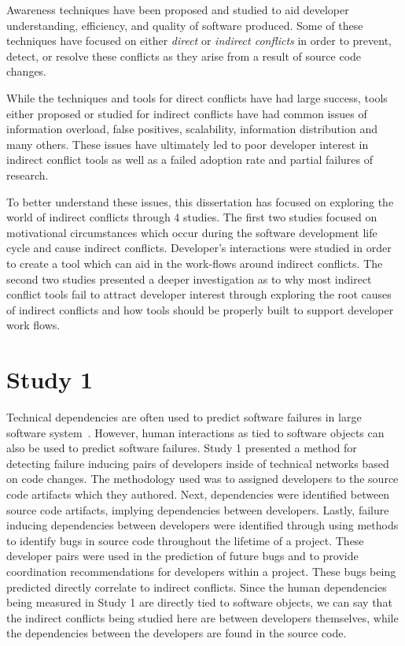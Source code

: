 \label{concl}

Awareness techniques have been proposed and studied to aid developer
understanding, efficiency, and quality of software produced. Some of these techniques have focused 
on either \textit{direct} or \textit{indirect conflicts} in order to prevent, detect, or resolve these conflicts as 
they arise from a result of source code changes. 

While the techniques and tools for direct conflicts have had large success, tools either proposed or studied for 
indirect conflicts have had common issues of information overload, false positives, scalability, information distribution 
and many others. These issues have ultimately led to poor developer interest in indirect conflict tools as well
as a failed adoption rate and partial failures of research.

To better understand these issues, this dissertation has focused on exploring the world of indirect 
conflicts through 4 studies. The first two studies focused on motivational circumstances which occur during 
the software development life cycle and cause indirect conflicts. Developer's interactions were studied in order to create 
a tool which can aid in the work-flows around indirect conflicts. The second two studies presented a deeper investigation 
as to why most indirect conflict tools fail to attract developer interest through exploring the root causes of indirect conflicts 
and how tools should be properly built to support developer work flows.

\section{Study 1}

Technical dependencies are often used to predict software failures
in large software system~\cite{Pinzger:2008:DNP, Zimmermann:2008:PDU, Kim:2006:AIB}. However, human interactions as tied
to software objects can also be used to predict software failures.
Study 1 presented a method for detecting failure inducing pairs of developers inside
of technical networks based on code changes. The methodology used was to assigned developers to the source code artifacts
which they authored. Next, dependencies were identified between source code artifacts, implying dependencies between
developers. Lastly, failure inducing dependencies between developers were identified through using methods to identify
bugs in source code throughout the lifetime of a project. These developer pairs were used in the prediction
of future bugs and to provide coordination recommendations for developers within a project. These bugs being predicted
directly correlate to indirect conflicts. Since the human dependencies being measured in Study 1 are directly tied to
software objects, we can say that the indirect conflicts being studied here are between developers themselves, while
the dependencies between the developers are found in the source code.

